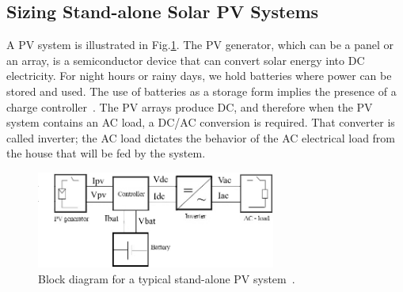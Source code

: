 \documentclass[runningheads]{llncs}
\begin{document}

\subsection{Sizing Stand-alone Solar PV Systems}
\label{sec:sizing}

A PV system is illustrated in Fig.\ref{fig:blockdiagram}. 
The PV generator, which can be a panel or an array, is a semiconductor device that can convert solar energy into DC electricity. 
For night hours or rainy days, we hold batteries where power can be stored and used. The use of batteries as a storage form implies the presence of a charge controller~\cite{Hansen}. The PV arrays produce DC, and therefore when the PV system contains an AC load, a DC/AC conversion is required. That converter is called inverter; the AC load dictates the behavior of the AC electrical load from the house that will be fed by the system.

\begin{figure}[h]
\includegraphics[width=0.7\textwidth]{blockdiagramPVS2_rev}
\centering
\caption{Block diagram for a typical stand-alone PV system~\cite{Hansen}.}
\label{fig:blockdiagram} 
\end{figure}
\end{document}
